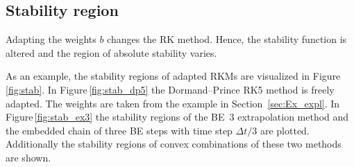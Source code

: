 \documentclass[a4paper]{article}
\numberwithin{equation}{section}
\theoremstyle{plain}
\theoremstyle{definition}
\numberwithin{theorem}{section}
\newcommand{\dt}{{\Delta t}}
\newcommand{\1}{\mathbbm{1}}
\begin{document}
\subsection{Stability region}

Adapting the weights $b$ changes the RK method. Hence, the stability
function is altered and the region of absolute stability varies.

As an example, the stability regions of adapted RKMs are visualized in
Figure\,\ref{fig:stab}.
In Figure\,\ref{fig:stab_dp5} the Dormand--Prince RK5 method is freely adapted.
The weights are taken from the example in Section~\ref{sec:Ex_expl}.
In Figure\,\ref{fig:stab_ex3} the stability regions of the BE~3
extrapolation method and the embedded chain of three BE steps with
time step $\dt/3$ are
plotted. Additionally the stability regions of convex combinations
of these two methods are shown.
\end{document}
